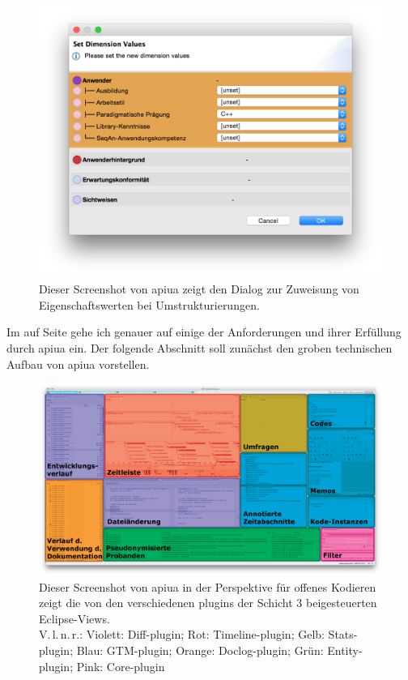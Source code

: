 \begin{figure}
  \centering
    \includegraphics[width=0.5\linewidth]{Figures/apiua/feature-properties-assignment.png}
  \caption[APIUA: Wertezuweisung bei Umstrukturierungen]{Dieser Screenshot von \gls{apiua} zeigt den Dialog zur Zuweisung von Eigenschaftswerten bei Umstrukturierungen.}
  \label{fig:apiua-feature-properties-assignment}
\end{figure}

Im  auf Seite \pageref{sec:gtm-implementation} gehe ich genauer auf einige der Anforderungen und ihrer Erfüllung durch \gls{apiua} ein. Der folgende Abschnitt soll zunächst den groben technischen Aufbau von \gls{apiua} vorstellen.

\begin{figure}
  \centering
    \includegraphics[width=1.0\linewidth]{Figures/apiua/plugins.png}
  \caption[APIUA: Architektur --- Plugins]{Dieser Screenshot von \gls{apiua} in der Perspektive für offenes Kodieren zeigt die von den verschiedenen \glspl{plugin} der Schicht 3 beigesteuerten Eclipse-Views.\\
  V.\,l.\,n.\,r.: Violett: Diff-\gls{plugin}; Rot: Timeline-\gls{plugin}; Gelb: Stats-\gls{plugin}; Blau: GTM-\gls{plugin}; Orange: Doclog-\gls{plugin}; Grün: Entity-\gls{plugin}; Pink: Core-\gls{plugin}}
  \label{fig:apiua-plugins}
\end{figure}

